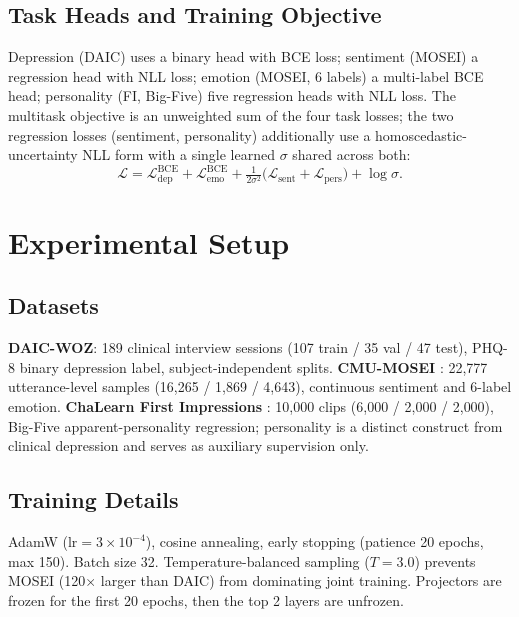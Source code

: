 \documentclass[letterpaper]{article}
\begin{document}
\subsection{Task Heads and Training Objective}

Depression (DAIC) uses a binary head with BCE loss; sentiment (MOSEI) a regression head with NLL loss; emotion (MOSEI, 6 labels) a multi-label BCE head; personality (FI, Big-Five) five regression heads with NLL loss. The multitask objective is an unweighted sum of the four task losses; the two regression losses (sentiment, personality) additionally use a homoscedastic-uncertainty NLL form \citep{kendall2017uncertainties} with a single learned $\sigma$ shared across both:
\[
\mathcal{L} = \mathcal{L}_{\text{dep}}^{\text{BCE}} + \mathcal{L}_{\text{emo}}^{\text{BCE}} + \tfrac{1}{2\sigma^2}\big(\mathcal{L}_{\text{sent}} + \mathcal{L}_{\text{pers}}\big) + \log\sigma.
\]

\section{Experimental Setup}

\subsection{Datasets}

\textbf{DAIC-WOZ}: 189 clinical interview sessions (107 train / 35 val / 47 test), PHQ-8 binary depression label, subject-independent splits. \textbf{CMU-MOSEI} \citep{zadeh2018multimodal}: 22{,}777 utterance-level samples (16{,}265 / 1{,}869 / 4{,}643), continuous sentiment and 6-label emotion. \textbf{ChaLearn First Impressions} \citep{escalante2020chalearn}: 10{,}000 clips (6{,}000 / 2{,}000 / 2{,}000), Big-Five apparent-personality regression; personality is a distinct construct from clinical depression and serves as auxiliary supervision only.

\subsection{Training Details}

AdamW ($\text{lr}{=}3\times10^{-4}$), cosine annealing, early stopping (patience 20 epochs, max 150). Batch size 32. Temperature-balanced sampling ($T{=}3.0$) prevents MOSEI (120$\times$ larger than DAIC) from dominating joint training. Projectors are frozen for the first 20 epochs, then the top 2 layers are unfrozen.
\end{document}
